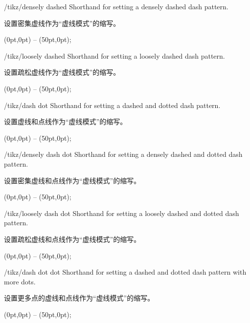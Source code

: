 \begin{stylekey}{/tikz/densely dashed}
    Shorthand for setting a densely dashed dash pattern.
    
    设置密集虚线作为“虚线模式”的缩写。
%
\begin{codeexample}[]
\tikz {} (0pt,0pt) -- (50pt,0pt);
\end{codeexample}
\end{stylekey}

\begin{stylekey}{/tikz/loosely dashed}
    Shorthand for setting a loosely dashed dash pattern.
    
    设置疏松虚线作为“虚线模式”的缩写。
%
\begin{codeexample}[]
\tikz {} (0pt,0pt) -- (50pt,0pt);
\end{codeexample}
\end{stylekey}

\begin{stylekey}{/tikz/dash dot}
    Shorthand for setting a dashed and dotted dash pattern.
    
    设置虚线和点线作为“虚线模式”的缩写。
%
\begin{codeexample}[]
\tikz {} (0pt,0pt) -- (50pt,0pt);
\end{codeexample}
\end{stylekey}

\begin{stylekey}{/tikz/densely dash dot}
    Shorthand for setting a densely dashed and dotted dash pattern.
    
    设置密集虚线和点线作为“虚线模式”的缩写。
%
\begin{codeexample}[]
\tikz {} (0pt,0pt) -- (50pt,0pt);
\end{codeexample}
\end{stylekey}

\begin{stylekey}{/tikz/loosely dash dot}
    Shorthand for setting a loosely dashed and dotted dash pattern.
    
    设置疏松虚线和点线作为“虚线模式”的缩写。
%
\begin{codeexample}[]
\tikz {} (0pt,0pt) -- (50pt,0pt);
\end{codeexample}
\end{stylekey}

\begin{stylekey}{/tikz/dash dot dot}
    Shorthand for setting a dashed and dotted dash pattern with more dots.
    
    设置更多点的虚线和点线作为“虚线模式”的缩写。
%
\begin{codeexample}[]
\tikz {} (0pt,0pt) -- (50pt,0pt);
\end{codeexample}
\end{stylekey}

